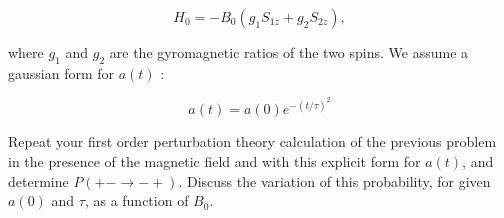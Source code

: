 \documentclass[12pt]{article}
\begin{document}
$$
H_{0}=-B_{0}\left(g_{1} S_{1 z}+g_{2} S_{2 z}\right),
$$

where $g_{1}$ and $g_{2}$ are the gyromagnetic ratios of the two spins. We assume a gaussian form for $a(t)$ :

$$
a(t)=a(0) e^{-(t / \tau)^{2}}
$$

Repeat your first order perturbation theory calculation of the previous problem in the presence of the magnetic field and with this explicit form for $a(t)$, and determine $P(+-\rightarrow-+)$. Discuss the variation of this probability, for given $a(0)$ and $\tau$, as a function of $B_{0}$.
\end{document}
